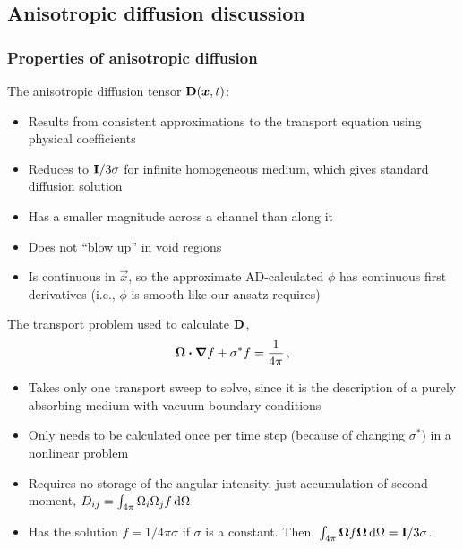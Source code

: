 \documentclass{beamer}
\begin{document}
\subsection{Anisotropic diffusion discussion}
\begin{frame}
  \frametitle{Properties of anisotropic diffusion}

  The anisotropic diffusion tensor $\mathbf{D}(\bm{x},t)$: 
  \begin{itemize}
    \item Results from consistent approximations to the transport equation
      using physical coefficients
    \item Reduces to $\mathbf{I}/3\sigma$ for infinite homogeneous
      medium, which gives standard diffusion solution
    \item Has a smaller magnitude across a channel than along it
    \item Does not ``blow up'' in void regions
    \item Is continuous in $\vec{x}$, so the approximate AD-calculated $\phi$
      has continuous first derivatives (i.e., $\phi$ is smooth like our ansatz
      requires)
  \end{itemize}
\end{frame}

\begin{frame}
  The transport problem used to calculate $\mathbf{D}$,
  \begin{equation*}
    \bm{\Omega}\bm{\cdot} \bm{\nabla} f + \sigma^* f = \frac{1}{4\pi} \,,
  \end{equation*}
  \vspace{-\baselineskip}
  \begin{itemize}
    \item Takes only one transport sweep to solve, since it is the description
      of a purely absorbing medium with vacuum boundary conditions
    \item Only needs to be calculated once per time step (because of changing
      $\sigma^*$) in a nonlinear problem \item Requires no storage of the
      angular intensity, just accumulation of second moment, $D_{ij} =
      \int_{4\pi} \Omega_i \Omega_j f \mathop{}\!\mathrm{d} \Omega$
    \item Has the solution $f=1/4\pi\sigma$ if $\sigma$ is a constant.
      Then, $\int_{4\pi} \bm{\Omega} f \bm{\Omega} \mathop{}\!\mathrm{d} \Omega =
      \mathbf{I}/3\sigma$.
  \end{itemize}
\end{frame}
\end{document}
